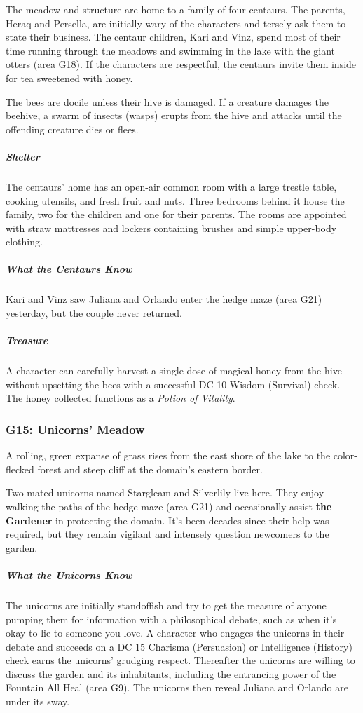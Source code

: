 \documentclass[10pt,a4paper,twoside,bg=print,twocolumn,openany,nodeprecatedcode]{dndbook}
\begin{document}
The meadow and structure are home to a family of four centaurs. The parents, Heraq and Persella, are initially wary of the characters and tersely ask them to state their business. The centaur children, Kari and Vinz, spend most of their time running through the meadows and swimming in the lake with the giant otters (area G18). If the characters are respectful, the centaurs invite them inside for tea sweetened with honey.

The bees are docile unless their hive is damaged. If a creature damages the beehive, a swarm of insects (wasps) erupts from the hive and attacks until the offending creature dies or flees.

\subparagraph{Shelter}
The centaurs' home has an open-air common room with a large trestle table, cooking utensils, and fresh fruit and nuts. Three bedrooms behind it house the family, two for the children and one for their parents. The rooms are appointed with straw mattresses and lockers containing brushes and simple upper-body clothing.

\subparagraph{What the Centaurs Know}
Kari and Vinz saw Juliana and Orlando enter the hedge maze (area G21) yesterday, but the couple never returned.

\subparagraph{Treasure}
A character can carefully harvest a single dose of magical honey from the hive without upsetting the bees with a successful DC 10 Wisdom (Survival) check. The honey collected functions as a \textit{Potion of Vitality}.

\subsubsection{G15: Unicorns' Meadow}
\begin{DndReadAloud}{}
A rolling, green expanse of grass rises from the east shore of the lake to the color-flecked forest and steep cliff at the domain's eastern border.

\end{DndReadAloud}

Two mated unicorns named Stargleam and Silverlily live here. They enjoy walking the paths of the hedge maze (area G21) and occasionally assist \textbf{the Gardener} in protecting the domain. It's been decades since their help was required, but they remain vigilant and intensely question newcomers to the garden.

\subparagraph{What the Unicorns Know}
The unicorns are initially standoffish and try to get the measure of anyone pumping them for information with a philosophical debate, such as when it's okay to lie to someone you love. A character who engages the unicorns in their debate and succeeds on a DC 15 Charisma (Persuasion) or Intelligence (History) check earns the unicorns' grudging respect. Thereafter the unicorns are willing to discuss the garden and its inhabitants, including the entrancing power of the Fountain All Heal (area G9). The unicorns then reveal Juliana and Orlando are under its sway.
\end{document}
